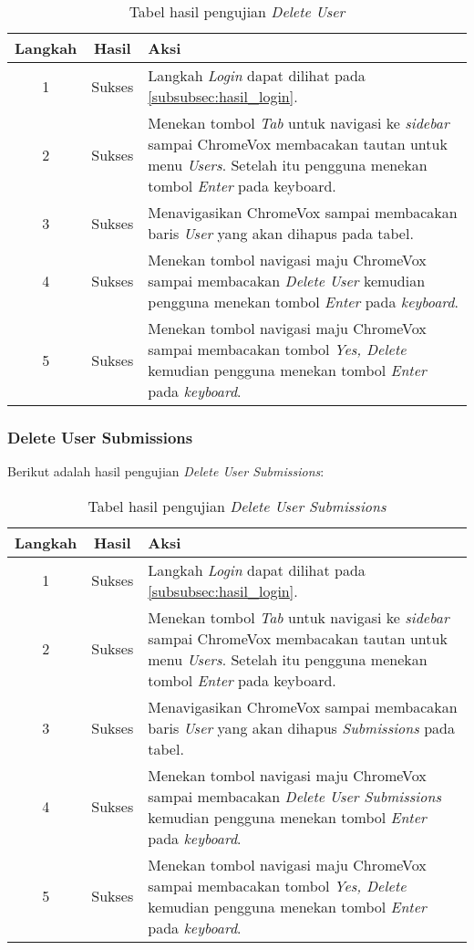 \begin{table}[H]
	\centering
	\caption{Tabel hasil pengujian \textit{Delete User}}
	\label{tab:hasil_delete_user}
	\begin{tabular}{|c|c|p{12cm}|}
		\toprule
		Langkah & Hasil & Aksi\\
		\midrule
		1 & Sukses & Langkah \textit{Login} dapat dilihat pada \ref{subsubsec:hasil_login}.\\
		2 & Sukses & Menekan tombol \textit{Tab} untuk navigasi ke \textit{sidebar} sampai ChromeVox membacakan tautan untuk menu \textit{Users}. Setelah itu pengguna menekan tombol \textit{Enter} pada keyboard.\\
		3 & Sukses & Menavigasikan ChromeVox sampai membacakan baris \textit{User} yang akan dihapus pada tabel.\\
		4 & Sukses & Menekan tombol navigasi maju ChromeVox sampai membacakan \textit{Delete User} kemudian pengguna menekan tombol \textit{Enter} pada \textit{keyboard}.\\
		5 & Sukses & Menekan tombol navigasi maju ChromeVox sampai membacakan tombol \textit{Yes, Delete} kemudian pengguna menekan tombol \textit{Enter} pada \textit{keyboard}.\\
		\bottomrule
	\end{tabular}
\end{table}

\subsubsection{Delete User Submissions}
\label{subsubsec:hasil_delete_user_submissions}
Berikut adalah hasil pengujian \textit{Delete User Submissions}:

\begin{table}[H]
	\centering
	\caption{Tabel hasil pengujian \textit{Delete User Submissions}}
	\label{tab:hasil_delete_user_submissions}
	\begin{tabular}{|c|c|p{12cm}|}
		\toprule
		Langkah & Hasil & Aksi\\
		\midrule
		1 & Sukses & Langkah \textit{Login} dapat dilihat pada \ref{subsubsec:hasil_login}.\\
		2 & Sukses & Menekan tombol \textit{Tab} untuk navigasi ke \textit{sidebar} sampai ChromeVox membacakan tautan untuk menu \textit{Users}. Setelah itu pengguna menekan tombol \textit{Enter} pada keyboard.\\
		3 & Sukses & Menavigasikan ChromeVox sampai membacakan baris \textit{User} yang akan dihapus \textit{Submissions} pada tabel.\\
		4 & Sukses & Menekan tombol navigasi maju ChromeVox sampai membacakan \textit{Delete User Submissions} kemudian pengguna menekan tombol \textit{Enter} pada \textit{keyboard}.\\
		5 & Sukses & Menekan tombol navigasi maju ChromeVox sampai membacakan tombol \textit{Yes, Delete} kemudian pengguna menekan tombol \textit{Enter} pada \textit{keyboard}.\\
		\bottomrule
	\end{tabular}
\end{table}


